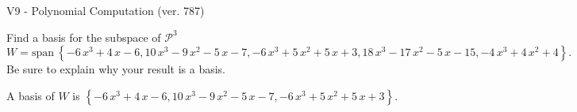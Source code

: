 \begin{exercise}
  \begin{exerciseTitle}V9 - Polynomial Computation (ver. 787)\end{exerciseTitle}
  \begin{exerciseStatement}
    Find a basis for the subspace of \(\mathcal{P}^3\) 
\[W=\mathrm{span}\ \left\{-6 \, x^{3} + 4 \, x - 6 , 10 \, x^{3} - 9 \, x^{2} - 5 \, x - 7 , -6 \, x^{3} + 5 \, x^{2} + 5 \, x + 3 , 18 \, x^{3} - 17 \, x^{2} - 5 \, x - 15 , -4 \, x^{3} + 4 \, x^{2} + 4\right\}.\]
 Be sure to explain why your result is a basis.


  \end{exerciseStatement}
  \begin{exerciseAnswer}
   A basis of \(W\) is  \(\left\{-6 \, x^{3} + 4 \, x - 6 , 10 \, x^{3} - 9 \, x^{2} - 5 \, x - 7 , -6 \, x^{3} + 5 \, x^{2} + 5 \, x + 3\right\}\).
  


  \end{exerciseAnswer}
\end{exercise}